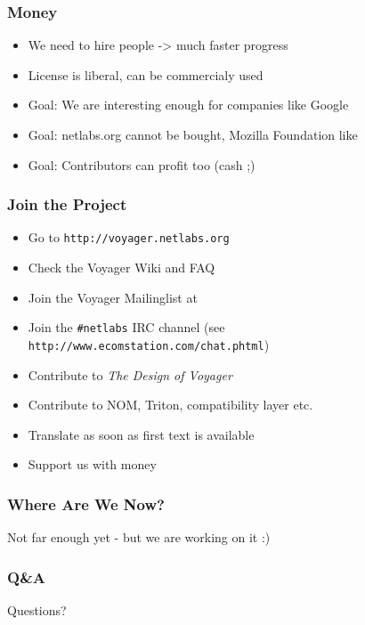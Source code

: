 \documentclass{beamer}
\begin{document}
\begin{frame}
\frametitle{Money}
\begin{itemize}[<+->]
  \item We need to hire people -> much faster progress
  \item License is liberal, can be commercialy used
  \item Goal: We are interesting enough for companies like Google
  \item Goal: netlabs.org cannot be bought, Mozilla Foundation like
  \item Goal: Contributors can profit too (cash ;)
\end{itemize}
\end{frame}

\begin{frame}
\frametitle{Join the Project}
\begin{itemize}[<+->]
  \item Go to \texttt{http://voyager.netlabs.org}
  \item Check the Voyager Wiki and FAQ
  \item Join the Voyager Mailinglist at
  \item Join the \texttt{\#netlabs} IRC channel (see
  \texttt{http://www.ecomstation.com/chat.phtml})
  \item Contribute to \textit{The Design of Voyager}
  \item Contribute to NOM, Triton, compatibility layer etc.
  \item Translate as soon as first text is available
  \item Support us with money
\end{itemize}
\end{frame}

\begin{frame}
\frametitle{Where Are We Now?}
	Not far enough yet - but we are working on it :)
\end{frame}

\begin{frame}
\frametitle{Q\&A}
	Questions?
\end{frame}
\end{document}
